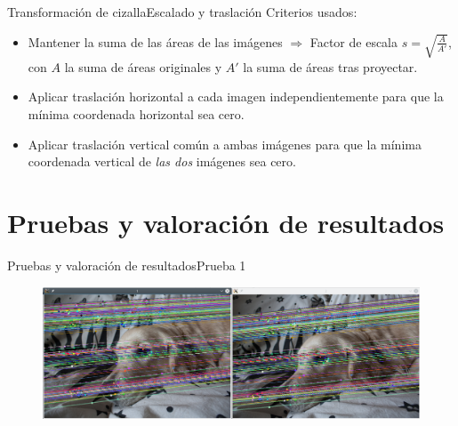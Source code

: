 \documentclass[aspectratio=169,14pt,spanish]{beamer}
\begin{document}
          \begin{frame}{Transformación de cizalla}{Escalado y traslación}
              Criterios usados:
              \begin{itemize}
                  \item Mantener la suma de las áreas de las imágenes $\Longrightarrow$ Factor de escala $s = \sqrt{\frac{A}{A'}}$, con $A$ la suma de áreas originales y $A'$ la suma de áreas tras proyectar.
                  \item Aplicar traslación horizontal a cada imagen independientemente para que la mínima coordenada horizontal sea cero.
                  \item Aplicar traslación vertical común a ambas imágenes para que la mínima coordenada vertical de \emph{las dos} imágenes sea cero.
              \end{itemize}
          \end{frame}



    \section{Pruebas y valoración de resultados}

      \begin{frame}{Pruebas y valoración de resultados}{Prueba 1}
          \begin{overlayarea}{\textwidth}{0}
               {\begin{figure}[ht!]
                \centering
                \includegraphics[width=\textwidth]{../Informe/Lola-Normal.png}
              \end{figure}}
          \end{overlayarea}
      \end{frame}
\end{document}

